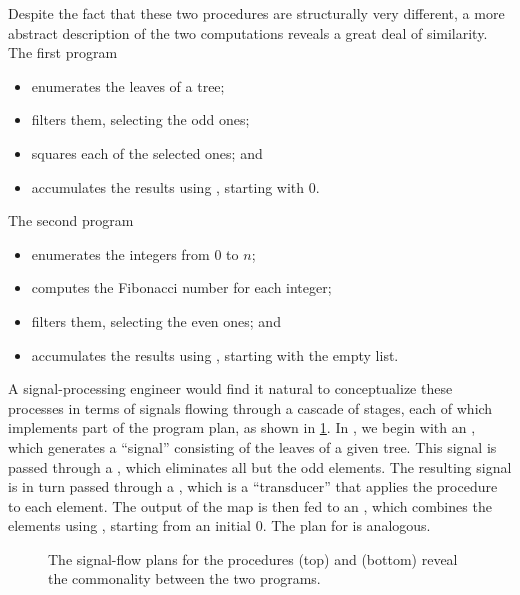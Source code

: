 Despite the fact that these two procedures are structurally very different, a more abstract description of the two computations reveals a great deal of similarity.
The first program
\begin{itemize}

	\item
		enumerates the leaves of a tree;

	\item
		filters them, selecting the odd ones;

	\item
		squares each of the selected ones; and

	\item
		accumulates the results using \code{+}, starting with \( 0 \).

\end{itemize}
The second program
\begin{itemize}

	\item
		enumerates the integers from \( 0 \) to \( n \);

	\item
		computes the Fibonacci number for each integer;

	\item
		filters them, selecting the even ones; and

	\item
		accumulates the results using , starting with the empty list.

\end{itemize}

A signal-processing engineer would find it natural to conceptualize these processes in terms of signals flowing through a cascade of stages, each of which implements part of the program plan, as shown in \cref{Figure 2.7}.
In , we begin with an , which generates a “signal” consisting of the leaves of a given tree.
This signal is passed through a , which eliminates all but the odd elements.
The resulting signal is in turn passed through a , which is a “transducer” that applies the  procedure to each element.
The output of the map is then fed to an , which combines the elements using \code{+}, starting from an initial \( 0 \).
The plan for  is analogous.

\begin{figure}[tb]
	\centering
	
	\caption{
		The signal-flow plans for the procedures  (top) and  (bottom) reveal the commonality between the two programs.
	}
	\label{Figure 2.7}
\end{figure}

